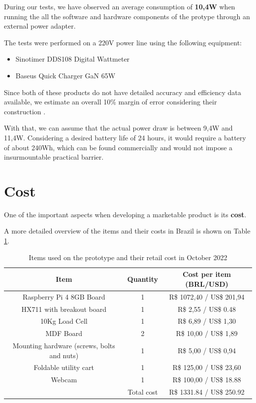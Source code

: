 \documentclass[openright]{normas-utf-tex} %
\begin{document}
During our tests, we have observed an average consumption of \textbf{10,4W}
when running the all the software and hardware components of the protype
through an external power adapter. 

The tests were performed on a 220V power line using the following equipment:
\begin{itemize}
    \item Sinotimer DDS108 Digital Wattmeter
    \item Baseus Quick Charger GaN 65W
\end{itemize}

Since both of these products do not have detailed accuracy and efficiency data
available, we estimate an overall 10\% margin of error considering their
construction \cite{Chen2017}. 

With that, we can assume that the actual power draw is between 9,4W and 11,4W.
Considering a desired  battery life of 24 hours, it would require a battery of
about 240Wh, which can be found commercially and would not impose a
insurmountable practical barrier.

\section{Cost}

One of the important aspects when developing a marketable product is its \textbf{cost}.

A more detailed overview of the items and their costs in Brazil is shown on Table \ref{tbl:cost}.

\begin{table}[H]
	\centering
	\label{tab:correlacao}
	\begin{tabular}{c c c}
		\hline 
        Item & Quantity & Cost per item (BRL/USD) \\
		\hline
        Raspberry Pi 4 8GB Board &  1 & R\$ 1072,40 / US\$ 201,94 \\
        HX711 with breakout board &  1  & R\$ 2,55 / US\$ 0.48 \\
        10Kg Load Cell & 1 & R\$ 6,89 / US\$ 1,30 \\
        MDF Board &  2  & R\$ 10,00 / US\$ 1,89 \\
        Mounting hardware (screws, bolts and nuts) &  1  & R\$ 5,00 / US\$ 0,94 \\
        Foldable utility cart &  1  & R\$ 125,00 / US\$ 23,60 \\
        Webcam &  1  & R\$ 100,00 / US\$ 18.88 \\
		\hline 
        & Total cost & R\$ 1331.84 / US\$ 250.92 \\
        \hline
	\end{tabular}
    \caption[Items used on the prototype and their approximate retail cost in Brazil as of October 2022]{Items used on the prototype and their retail cost in October 2022}
    \label{tbl:cost}
\end{table}
\end{document}

